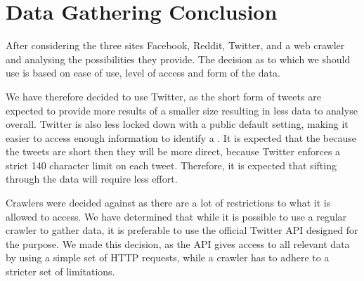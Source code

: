 \section{Data Gathering Conclusion}\label{sec:social-media-conclusion}
After considering the three sites Facebook, Reddit, Twitter, and a web crawler
and analysing the possibilities they provide. The decision as to which we
should use is based on ease of use, level of access and form of the data.\nl

We have therefore decided to use Twitter, as the short form of tweets are
expected to provide more results of a smaller size resulting in less data to
analyse overall. Twitter is also less locked down with a public default
setting, making it easier to access enough information to identify a \fb. It is
expected that the because the tweets are short then they will be more direct,
because Twitter enforces a strict 140 character limit on each tweet. Therefore,
it is expected that sifting through the data will require less effort.\nl

Crawlers were decided against as there are a lot of restrictions to what it is
allowed to access. We have determined that while it is possible to use a
regular crawler to gather data, it is preferable to use the official Twitter
\ac{API} designed for the purpose. We made this decision, as the
\ac{API} gives access to all relevant data by using a simple set of \ac{HTTP}
requests, while a crawler has to adhere to a stricter set of limitations.

